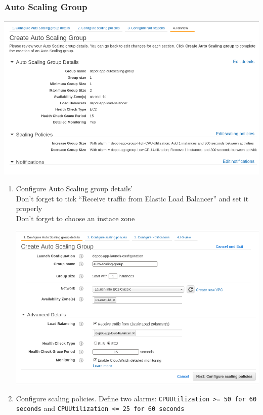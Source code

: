 \documentclass{beamer}
\begin{document}
\begin{frame}
\frametitle{Auto Scaling Group}
\begin{center}
\includegraphics[scale=0.30]{review-autoscale.png}
\end{center}
\begin{enumerate}
\item Configure Auto Scaling group details'\\
\alert{Don't forget to tick ``Receive traffic from Elastic Load Balancer'' and set it properly}\\
\alert{Don't forget to choose an instace zone}
\begin{center}
\includegraphics[scale=0.20]{create-auto-scaling01.png}
\end{center}
\item Configure scaling policies. Define two alarms: \texttt{CPUUtilization >= 50 for 60 seconds} and \texttt{CPUUtilization <= 25 for 60 seconds}
\begin{center}

\end{center}
\end{enumerate}
\end{frame}
\end{document}
